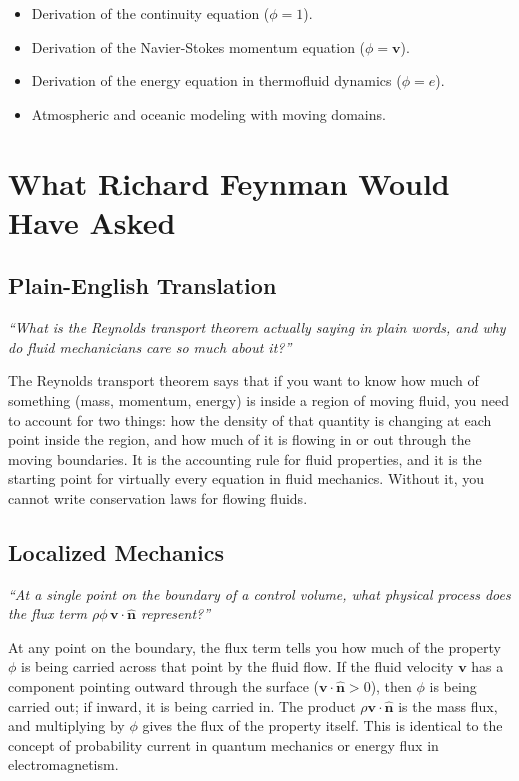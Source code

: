\documentclass[11pt,openright]{book}
\begin{document}
\begin{itemize}
    \item Derivation of the continuity equation ($\phi = 1$).
    \item Derivation of the Navier-Stokes momentum equation ($\phi = \mathbf{v}$).
    \item Derivation of the energy equation in thermofluid dynamics ($\phi = e$).
    \item Atmospheric and oceanic modeling with moving domains.
\end{itemize}
\section*{What Richard Feynman Would Have Asked}

\subsection*{Plain-English Translation}
\textit{``What is the Reynolds transport theorem actually saying in plain words, and why do fluid mechanicians care so much about it?''}

The Reynolds transport theorem says that if you want to know how much of something (mass, momentum, energy) is inside a region of moving fluid, you need to account for two things: how the density of that quantity is changing at each point inside the region, and how much of it is flowing in or out through the moving boundaries. It is the accounting rule for fluid properties, and it is the starting point for virtually every equation in fluid mechanics. Without it, you cannot write conservation laws for flowing fluids.

\subsection*{Localized Mechanics}
\textit{``At a single point on the boundary of a control volume, what physical process does the flux term $\rho\phi\,\mathbf{v}\cdot\hat{\mathbf{n}}$ represent?''}

At any point on the boundary, the flux term tells you how much of the property $\phi$ is being carried across that point by the fluid flow. If the fluid velocity $\mathbf{v}$ has a component pointing outward through the surface ($\mathbf{v}\cdot\hat{\mathbf{n}} > 0$), then $\phi$ is being carried out; if inward, it is being carried in. The product $\rho\mathbf{v}\cdot\hat{\mathbf{n}}$ is the mass flux, and multiplying by $\phi$ gives the flux of the property itself. This is identical to the concept of probability current in quantum mechanics or energy flux in electromagnetism.
\end{document}
